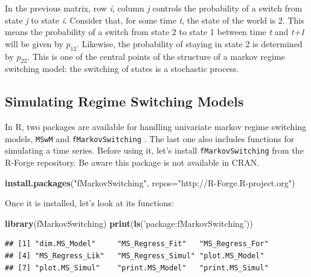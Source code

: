 \documentclass[11pt,]{book}
\newenvironment{Shaded}{\begin{snugshade}}{\end{snugshade}}
\newcommand{\KeywordTok}[1]{\textcolor[rgb]{0.27,0.27,0.27}{\textbf{#1}}}
\newcommand{\DataTypeTok}[1]{\textcolor[rgb]{0.27,0.27,0.27}{#1}}
\newcommand{\StringTok}[1]{\textcolor[rgb]{0.5,0.5,0.5}{#1}}
\newcommand{\NormalTok}[1]{#1}
\begin{document}
In the previous matrix, row \emph{i}, column \emph{j} controls the
probability of a switch from state \emph{j} to state \emph{i}. Consider
that, for some time \emph{t}, the state of the world is 2. This means
the probability of a switch from state 2 to state 1 between time
\emph{t} and \emph{t+1} will be given by \(p_{12}\). Likewise, the
probability of staying in state 2 is determined by \(p_{22}\). This is
one of the central points of the structure of a markov regime switching
model: the switching of states is a stochastic process.

\subsection{Simulating Regime Switching
Models}\label{simulating-regime-switching-models}

In R, two packages are available for handling univariate markov regime
switching models, \texttt{MSwM} \citep{mswm} and
\texttt{fMarkovSwitching} \citep{fmarkovswitching}. The last one also
includes functions for simulating a time series. Before using it, let's
install \texttt{fMarkovSwitching} from the R-Forge repository. Be aware
this package is not available in CRAN.

\begin{Shaded}
\begin{Highlighting}[]
\KeywordTok{install.packages}\NormalTok{(}\StringTok{"fMarkovSwitching"}\NormalTok{, }
                 \DataTypeTok{repos=}\StringTok{"http://R-Forge.R-project.org"}\NormalTok{)}
\end{Highlighting}
\end{Shaded}

Once it is installed, let's look at its functions:

\begin{Shaded}
\begin{Highlighting}[]
\KeywordTok{library}\NormalTok{(fMarkovSwitching)}
\KeywordTok{print}\NormalTok{(}\KeywordTok{ls}\NormalTok{(}\StringTok{'package:fMarkovSwitching'}\NormalTok{))}
\end{Highlighting}
\end{Shaded}

\begin{verbatim}
## [1] "dim.MS_Model"     "MS_Regress_Fit"   "MS_Regress_For"  
## [4] "MS_Regress_Lik"   "MS_Regress_Simul" "plot.MS_Model"   
## [7] "plot.MS_Simul"    "print.MS_Model"   "print.MS_Simul"
\end{verbatim}
\end{document}
